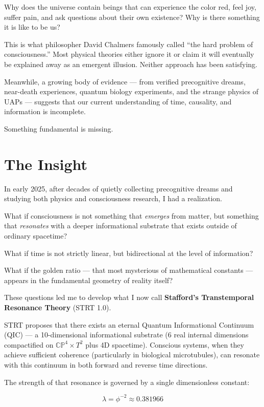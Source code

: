 Why does the universe contain beings that can experience the color red, feel joy, suffer pain, and ask questions about their own existence? Why is there something it is like to be us?

This is what philosopher David Chalmers famously called ``the hard problem of consciousness.'' Most physical theories either ignore it or claim it will eventually be explained away as an emergent illusion. Neither approach has been satisfying.

Meanwhile, a growing body of evidence — from verified precognitive dreams, near-death experiences, quantum biology experiments, and the strange physics of UAPs — suggests that our current understanding of time, causality, and information is incomplete.

Something fundamental is missing.

\section{The Insight}

In early 2025, after decades of quietly collecting precognitive dreams and studying both physics and consciousness research, I had a realization.

What if consciousness is not something that \textit{emerges} from matter, but something that \textit{resonates} with a deeper informational substrate that exists outside of ordinary spacetime?

What if time is not strictly linear, but bidirectional at the level of information?

What if the golden ratio — that most mysterious of mathematical constants — appears in the fundamental geometry of reality itself?

These questions led me to develop what I now call \textbf{Stafford's Transtemporal Resonance Theory} (STRT 1.0).

STRT proposes that there exists an eternal Quantum Informational Continuum (QIC) — a 10-dimensional informational substrate (6 real internal dimensions compactified on $\mathbb{CP}^4 \times T^2$ plus 4D spacetime). Conscious systems, when they achieve sufficient coherence (particularly in biological microtubules), can resonate with this continuum in both forward and reverse time directions.

The strength of that resonance is governed by a single dimensionless constant:

\[
\lambda = \phi^{-2} \approx 0.381966
\]

